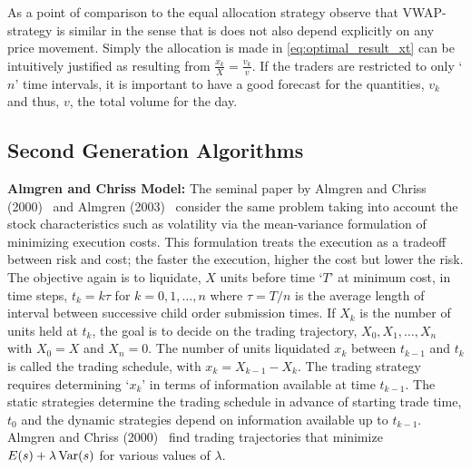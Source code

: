 As a point of comparison to the equal allocation strategy observe that VWAP-strategy is similar in the sense that is does not also depend explicitly on any price movement. Simply the allocation is made in \eqref{eq:optimal_result_xt} can be intuitively justified as resulting from $\frac{x_k}{X}= \frac{v_k}{v}$. If the traders are restricted to only `$n$' time intervals, it is important to have a good forecast for the quantities, $v_k$ and thus, $v$, the total volume for the day. 



\subsection{Second Generation Algorithms \label{subsec:almchrmodel}}


\noindent\textbf{Almgren and Chriss Model:} The seminal paper by Almgren and Chriss (2000)~\cite{alm2000} and Almgren (2003)~\cite{almgren2003} consider the same problem taking into account the stock characteristics such as volatility via the mean-variance formulation of minimizing execution costs. This formulation treats the execution as a tradeoff between risk and cost; the faster the execution, higher the cost but lower the risk. The objective again is to liquidate, $X$ units before time `$T$' at minimum cost, in time steps, $t_k = k \tau$ for $k = 0,1,\ldots, n$ where $\tau = T/n$ is the average length of interval between successive child order submission times. If $X_k$ is the number of units held at $t_k$, the goal is to decide on the trading trajectory, $X_0, X_1, \ldots, X_n$ with $X_0=X$ and $X_n=0$. The number of units liquidated $x_k$ between $t_{k-1}$ and $t_k$ is called the trading schedule, with $x_k = X_{k-1} - X_k$. The trading strategy requires determining `$x_k$' in terms of information available at time $t_{k-1}$. The static strategies determine the trading schedule in advance of starting trade time, $t_0$ and the dynamic strategies depend on information available up to $t_{k-1}$. Almgren and Chriss (2000)~\cite{alm2000} find trading trajectories that minimize $E(s)+\lambda \operatorname{Var}(s)$ for various values of $\lambda$.


